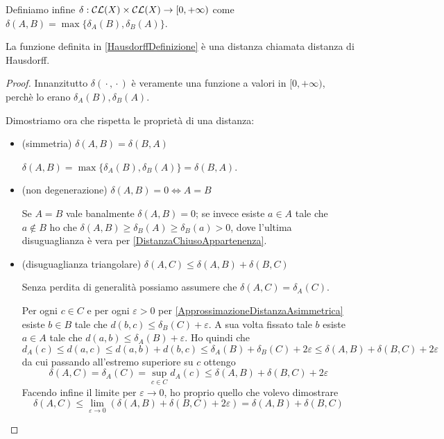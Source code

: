 \begin{definition}\label{HausdorffDefinizione}
	Definiamo infine $\delta:\mathcal{CL}(X)\times \mathcal{CL}(X) \to [0,+\infty)$ come $\delta(A,B)=\max\{ \delta_A(B),\delta_B(A) \}$.
\end{definition}

\begin{theorem}
	La funzione definita in \cref{HausdorffDefinizione} è una distanza chiamata distanza di Hausdorff.
\end{theorem}

\begin{proof}
	Innanzitutto $\delta({}\cdot{},{}\cdot{})$ è veramente una funzione a valori in $[0,+\infty)$, perchè lo erano $\delta_A(B),\delta_B(A)$.

	Dimostriamo ora che rispetta le proprietà di una distanza:
	\begin{itemize}
		\item (simmetria) $\delta(A,B)=\delta(B,A)$
		
		$\delta(A,B)=\max\{ \delta_A(B),\delta_B(A) \}=\delta(B,A)$.
		\item (non degenerazione) $\delta(A,B)=0 \iff A=B$
		
		Se $A=B$ vale banalmente $\delta(A,B)=0$; se invece esiste $a\in A$ tale che $a\not\in B$ ho che $\delta(A,B)\ge \delta_B(A)\ge \delta_B(a)>0$, dove l'ultima disuguaglianza è vera per \cref{DistanzaChiusoAppartenenza}.
		\item (disuguaglianza triangolare) $\delta(A,C)\le \delta(A,B)+\delta(B,C)$

		Senza perdita di generalità possiamo assumere che $\delta(A,C)=\delta_A(C)$. 

		Per ogni $c\in C$ e per ogni $\varepsilon>0$ per \cref{ApprossimazioneDistanzaAsimmetrica} esiste $b\in B$ tale che $d(b,c)\le \delta_B(C)+\varepsilon$. A sua volta fissato tale $b$ esiste $a\in A$ tale che $d(a,b)\le \delta_A(B)+\varepsilon$. Ho quindi che
		\begin{equation*}
			d_A(c)\le d(a,c)\le d(a,b)+d(b,c)\le \delta_A(B)+\delta_B(C)+2\varepsilon\le \delta(A,B)+\delta(B,C)+2\varepsilon
		\end{equation*}
		da cui passando all'estremo superiore su $c$ ottengo
		\begin{equation*}
			\delta(A,C)=\delta_A(C)=\sup_{c\in C}d_A(c)\le \delta(A,B)+\delta(B,C)+2\varepsilon
		\end{equation*}
		Facendo infine il limite per $\varepsilon\to 0$, ho proprio quello che volevo dimostrare
		\begin{equation*}
			\delta(A,C)\le \lim_{\varepsilon\to 0}(\delta(A,B)+\delta(B,C)+2\varepsilon)=\delta(A,B)+\delta(B,C)
		\end{equation*}
	\end{itemize}
\end{proof}

